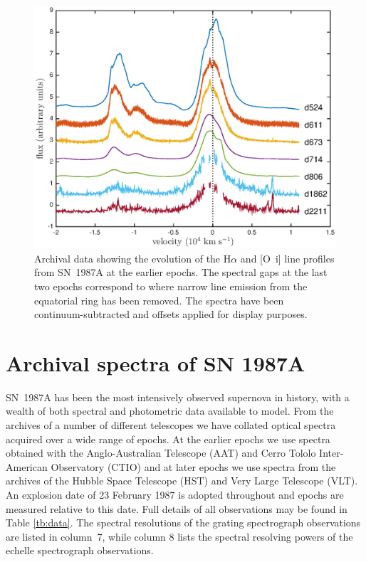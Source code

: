 \documentclass[useAMS,usenatbib,usegraphicx]{mnras}
\begin{document}
\begin{figure}
\includegraphics[trim =39 10 45 15,clip=true,scale=0.51]{Ha_evol_early_1col}
\caption{Archival data showing the evolution of the H$\alpha$ and
[O~{\sc i}] line profiles from SN~1987A at the earlier epochs. The 
spectral gaps at the last two epochs correspond to where narrow line 
emission from the equatorial ring has been removed. The spectra have been
continuum-subtracted and offsets applied for display purposes.}
\label{Ha_evol_early}
\end{figure}


\section{Archival spectra of SN 1987A}
\label{spectra}

SN~1987A has been the most intensively observed supernova in history, with 
a wealth of both spectral and photometric data available to model.  From 
the archives of a number of different telescopes we have collated optical 
spectra acquired over a wide range of epochs.  At the earlier epochs we 
use spectra obtained with the Anglo-Australian Telescope (AAT) and Cerro 
Tololo Inter-American Observatory (CTIO) and at later epochs we 
use spectra from the archives of the Hubble Space Telescope (HST) and Very 
Large Telescope (VLT).  An explosion date of 23 February 1987 is adopted 
throughout and epochs are measured relative to this date.  Full details of 
all observations may be found in Table \ref{tb:data}. The spectral 
resolutions of the grating spectrograph observations are listed in 
column~7, while column 8 lists the spectral resolving powers of the 
echelle spectrograph observations.
\end{document}
